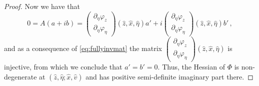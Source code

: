 \documentclass[
	fontsize=11pt, 
	twoside=false, 
	abstract=true, 
	a4paper,
]{scrartcl}
\newcommand{\RR}{\mathbb{R}}
\newcommand{\del}{\partial}
\begin{document}
\begin{proof}
	Now we have that 
	\[
		0 = A(a+ib) = \begin{pmatrix} \del_\eta \varphi_z \\ \del_\eta\varphi_\eta \end{pmatrix}(\hat z,\hat x, \hat \eta)a' + i \begin{pmatrix} \del_\eta \varphi_z \\ \del_\eta\varphi_\eta \end{pmatrix}(\hat z,\hat x, \hat \eta)b'\,,
	\]
	and as a consequence of \cref{eq:fullyinvmat} the matrix $\begin{pmatrix} \del_\eta \varphi_z \\ \del_\eta\varphi_\eta \end{pmatrix}(\hat z,\hat x, \hat \eta)$ is injective, from which we conclude that $a' = b' = 0$.
	Thus, the Hessian of $\Phi$ is non-degenerate at $(\hat z, \hat \eta;\hat x, \hat v)$ and has positive semi-definite imaginary part there.


\end{proof}
\end{document}
